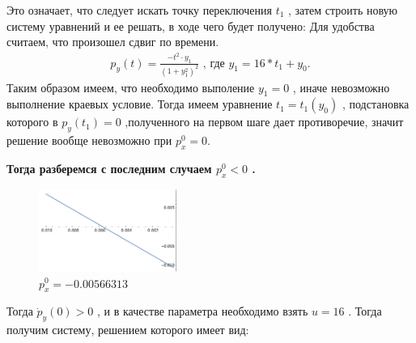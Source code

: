 \documentclass[a4paper,12pt]{article}
\begin{document}
Это означает, что следует искать точку переключения $t_1$ , затем строить новую систему уравнений и ее решать, в ходе чего будет получено:
Для удобства считаем, что произошел сдвиг по времени.
\begin{align*}
    p_y(t)=\frac{- t^2\cdot y_1}{(1+y_1^2)^2}\text{ , где }y_1=16*t_1+y_0.
\end{align*}
Таким образом имеем, что необходимо выполение $y_1=0$ , иначе невозможно выполнение краевых условие. Тогда имеем уравнение $t_1=t_1(y_0)$ , подстановка которого в $p_y(t_1)=0$ ,полученного на первом шаге дает противоречие, значит решение вообще невозможно при $p_x^0=0$.

\textbf{ Тогда разберемся с последним случаем $p_x^0<0$ .}

\begin{figure}
    \includegraphics[width=0.4\textwidth]{img4.png}
    \caption{$p_x^0=-0.00566313$}
\end{figure}

Тогда $\dot p_y(0)>0$ , и в качестве параметра необходимо взять $u=16$ . Тогда получим систему, решением которого имеет вид:
\end{document}
